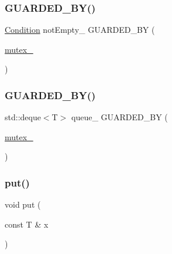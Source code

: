 \subsubsection{\texorpdfstring{G\+U\+A\+R\+D\+E\+D\+\_\+\+B\+Y()}{GUARDED\_BY()}\hspace{0.1cm}{\footnotesize\ttfamily [1/2]}}
{\footnotesize\ttfamily \hyperlink{classmuduo_1_1Condition}{Condition} not\+Empty\+\_\+ G\+U\+A\+R\+D\+E\+D\+\_\+\+BY (\begin{DoxyParamCaption}\item[{\hyperlink{classmuduo_1_1BlockingQueue_a6e1bf1809a42f40f1a21178dc6620a6f}{mutex\+\_\+}}]{ }\end{DoxyParamCaption})\hspace{0.3cm}{\ttfamily [private]}}

\mbox{\label{classmuduo_1_1BlockingQueue_acad94d46306e0fa11e88613d5bfd7976}} 
\subsubsection{\texorpdfstring{G\+U\+A\+R\+D\+E\+D\+\_\+\+B\+Y()}{GUARDED\_BY()}\hspace{0.1cm}{\footnotesize\ttfamily [2/2]}}
{\footnotesize\ttfamily std\+::deque$<$T$>$ queue\+\_\+ G\+U\+A\+R\+D\+E\+D\+\_\+\+BY (\begin{DoxyParamCaption}\item[{\hyperlink{classmuduo_1_1BlockingQueue_a6e1bf1809a42f40f1a21178dc6620a6f}{mutex\+\_\+}}]{ }\end{DoxyParamCaption})\hspace{0.3cm}{\ttfamily [private]}}

\mbox{\label{classmuduo_1_1BlockingQueue_a9b315be92f51608e0d347f1fe77b8e3f}} 
\subsubsection{\texorpdfstring{put()}{put()}\hspace{0.1cm}{\footnotesize\ttfamily [1/2]}}
{\footnotesize\ttfamily void put (\begin{DoxyParamCaption}\item[{const T \&}]{x }\end{DoxyParamCaption})\hspace{0.3cm}{\ttfamily [inline]}}



